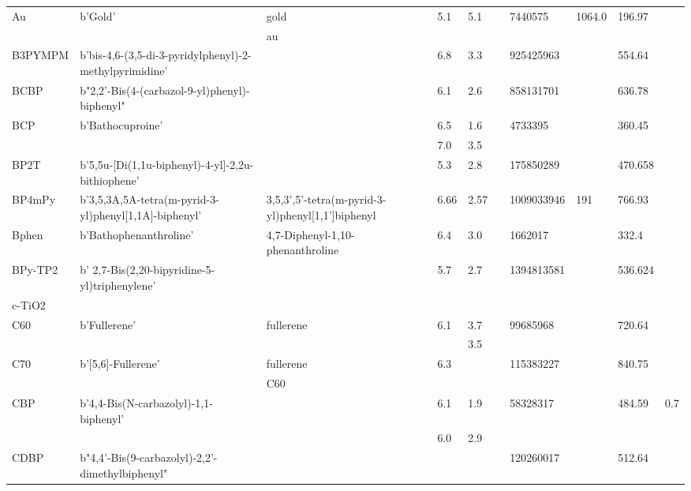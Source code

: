\documentclass[../thesis.tex]{subfiles}
\begin{document}
\begin{landscape}
\begin{longtable}{| p{} | p{} | p{} | p{} | p{} | p{} | p{} | p{} | p{} | p{} | }
 \hline 
Au & b'Gold' & gold & 5.1 & 5.1 &  & 7440575 & 1064.0 & 196.97 &  \\ 
 & & au &  &  &  &  & & & \\ 
 
 \hline 
B3PYMPM & b'bis-4,6-(3,5-di-3-pyridylphenyl)-2-methylpyrimidine' &  & 6.8 & 3.3 &  & 925425963 &  & 554.64 &  \\ 
 
 \hline 
BCBP & b"2,2'-Bis(4-(carbazol-9-yl)phenyl)-biphenyl" &  & 6.1 & 2.6 &  & 858131701 &  & 636.78 &  \\ 
 
 \hline 
BCP & b'Bathocuproine' &  & 6.5 & 1.6 &  & 4733395 &  & 360.45 &  \\ 
 & &  & 7.0 & 3.5 &  &  & & & \\ 
 
 \hline 
BP2T & b'5,5u-[Di(1,1u-biphenyl)-4-yl]-2,2u-bithiophene' &  & 5.3 & 2.8 &  & 175850289 &  & 470.658 &  \\ 
 
 \hline 
BP4mPy & b'3,5,3A,5A-tetra(m-pyrid-3-yl)phenyl[1,1A]-biphenyl' & 3,5,3',5'-tetra(m-pyrid-3-yl)phenyl[1,1']biphenyl & 6.66 & 2.57 &  & 1009033946 & 191 & 766.93 &  \\ 
 
 \hline 
Bphen & b'Bathophenanthroline' & 4,7-Diphenyl-1,10-phenanthroline & 6.4 & 3.0 &  & 1662017 &  & 332.4 &  \\ 
 
 \hline 
BPy-TP2 & b' 2,7-Bis(2,20-bipyridine-5-yl)triphenylene' &  & 5.7 & 2.7 &  & 1394813581 &  & 536.624 &  \\ 
 
 \hline 
c-TiO2 &  &  &  &  &  &  &  &  &  \\ 
 
 \hline 
C60 & b'Fullerene' & fullerene & 6.1 & 3.7 &  & 99685968 &  & 720.64 &  \\ 
 & &  &  & 3.5 &  &  & & & \\ 
 
 \hline 
C70 & b'[5,6]-Fullerene' & fullerene & 6.3 &  &  & 115383227 &  & 840.75 &  \\ 
 & & C60 &  &  &  &  & & & \\ 
 
 \hline 
CBP & b'4,4-Bis(N-carbazolyl)-1,1-biphenyl' &  & 6.1 & 1.9 &  & 58328317 &  & 484.59 & 0.7 \\ 
 & &  & 6.0 & 2.9 &  &  & & & \\ 
 
 \hline 
CDBP & b"4,4'-Bis(9-carbazolyl)-2,2'-dimethylbiphenyl" &  &  &  &  & 120260017 &  & 512.64 &  \\ 
 

\end{longtable}
\end{landscape}
\end{document}
